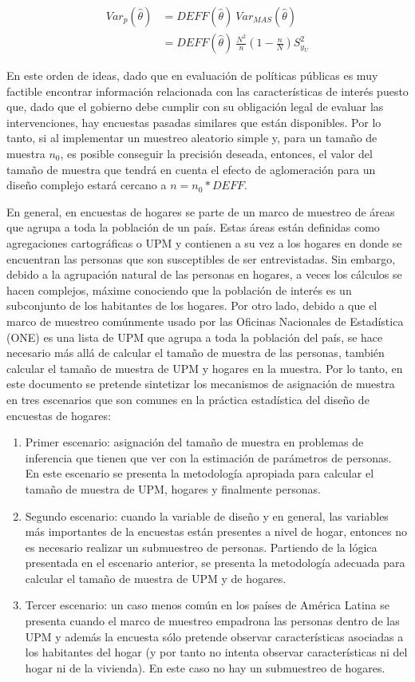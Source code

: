 \documentclass[
  12pt,
  spanish,
]{book}
\begin{document}
\begin{align}
Var_p(\hat{\theta}) & = DEFF(\hat{\theta}) \ Var_{MAS}(\hat{\theta}) \\
& = DEFF(\hat{\theta}) \ \frac{N^2}{n}\left(1-\frac{n}{N}\right)S^2_{y_U}
\end{align}

En este orden de ideas, dado que en evaluación de políticas públicas es muy factible encontrar información relacionada con las características de interés puesto que, dado que el gobierno debe cumplir con su obligación legal de evaluar las intervenciones, hay encuestas pasadas similares que están disponibles. Por lo tanto, si al implementar un muestreo aleatorio simple y, para un tamaño de muestra \(n_0\), es posible conseguir la precisión deseada, entonces, el valor del tamaño de muestra que tendrá en cuenta el efecto de aglomeración para un diseño complejo estará cercano a \(n=n_0*DEFF\).

En general, en encuestas de hogares se parte de un marco de muestreo de áreas que agrupa a toda la población de un país. Estas áreas están definidas como agregaciones cartográficas o UPM y contienen a su vez a los hogares en donde se encuentran las personas que son susceptibles de ser entrevistadas. Sin embargo, debido a la agrupación natural de las personas en hogares, a veces los cálculos se hacen complejos, máxime conociendo que la población de interés es un subconjunto de los habitantes de los hogares. Por otro lado, debido a que el marco de muestreo comúnmente usado por las Oficinas Nacionales de Estadística (ONE) es una lista de UPM que agrupa a toda la población del país, se hace necesario más allá de calcular el tamaño de muestra de las personas, también calcular el tamaño de muestra de UPM y hogares en la muestra. Por lo tanto, en este documento se pretende sintetizar los mecanismos de asignación de muestra en tres escenarios que son comunes en la práctica estadística del diseño de encuestas de hogares:

\begin{enumerate}
\def\labelenumi{\arabic{enumi}.}
\item
  Primer escenario: asignación del tamaño de muestra en problemas de inferencia que tienen que ver con la estimación de parámetros de personas. En este escenario se presenta la metodología apropiada para calcular el tamaño de muestra de UPM, hogares y finalmente personas.
\item
  Segundo escenario: cuando la variable de diseño y en general, las variables más importantes de la encuestas están presentes a nivel de hogar, entonces no es necesario realizar un submuestreo de personas. Partiendo de la lógica presentada en el escenario anterior, se presenta la metodología adecuada para calcular el tamaño de muestra de UPM y de hogares.
\item
  Tercer escenario: un caso menos común en los países de América Latina se presenta cuando el marco de muestreo empadrona las personas dentro de las UPM y además la encuesta sólo pretende observar características asociadas a los habitantes del hogar (y por tanto no intenta observar características ni del hogar ni de la vivienda). En este caso no hay un submuestreo de hogares.
\end{enumerate}
\end{document}
